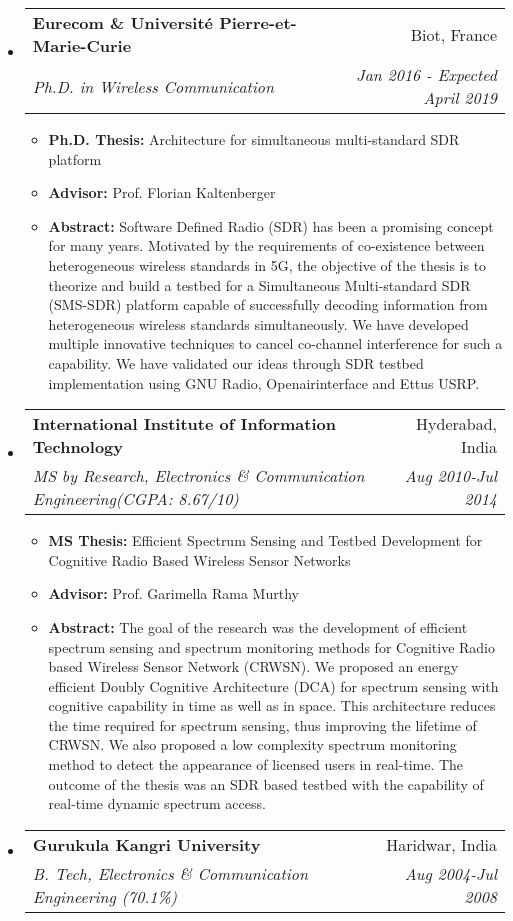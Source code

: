\documentclass[res,10pt]{article}
\makeatletter
\newlength{\outerbordwidth}
\newcommand{\resitem}[1]{\item #1 \vspace{-2pt}}
\newcommand{\resheading}[1]{\vspace{8pt}
  \parbox{\textwidth}{\setlength{\FrameSep}{\outerbordwidth}
    \begin{shaded}
\setlength{\fboxsep}{0pt}\framebox[\textwidth][l]{\setlength{\fboxsep}{4pt}\fcolorbox{shadecolorB}{shadecolorB}{\textbf{\sffamily{\mbox{~}\makebox[6.762in][l]{\large #1} \vphantom{p\^{E}}}}}}
    \end{shaded}
  }\vspace{-5pt}
}
\newcommand{\ressubheading}[4]{
\begin{tabular*}{6.5in}{l@{\cftdotfill{\cftsecdotsep}\extracolsep{\fill}}r}
		\textbf{#1} & #2 \\
		\textit{#3} & \textit{#4} \\
\end{tabular*}\vspace{-6pt}}
\makeatother
\begin{document}
\justify
\vspace{-2em}
\resheading{Education}
\begin{itemize}
\item
	\ressubheading{Eurecom \& Université Pierre-et-Marie-Curie}{Biot, France}{Ph.D. in Wireless Communication}{Jan 2016 - Expected April 2019}
\begin{itemize}
	\resitem{\textbf{Ph.D. Thesis:} Architecture for simultaneous multi-standard SDR platform}
	\resitem{\textbf{Advisor:}  Prof. Florian Kaltenberger}
	\resitem{\textbf{Abstract:} 
	Software Defined Radio (SDR) has been a promising concept for many years. 
		Motivated by the requirements of co-existence between heterogeneous wireless standards in 5G, the objective of the thesis is to theorize and build a testbed for a Simultaneous Multi-standard SDR (SMS-SDR) platform capable of successfully decoding information from heterogeneous wireless standards simultaneously. 
We have developed multiple innovative techniques to cancel co-channel interference for such a capability.
		 We have validated our ideas through SDR testbed implementation using GNU Radio, Openairinterface and Ettus USRP.}
	 \end{itemize}
\item
	\ressubheading{International Institute of Information Technology}{Hyderabad, India}{MS by Research, Electronics \& Communication Engineering(CGPA: 8.67/10)}{Aug 2010-Jul 2014}
\begin{itemize}
	\resitem{\textbf{MS Thesis:} Efficient Spectrum Sensing and Testbed Development for Cognitive Radio Based Wireless
		Sensor Networks}
	\resitem{\textbf{Advisor:} Prof. Garimella Rama Murthy}
	\resitem{\textbf{Abstract:} The goal of the research was the development of efficient spectrum sensing and spectrum monitoring methods for Cognitive Radio based Wireless Sensor Network (CRWSN). We proposed an energy efficient Doubly Cognitive Architecture (DCA) for spectrum sensing with cognitive capability in time as well as in space. This architecture reduces the time required for spectrum sensing, thus improving the lifetime of CRWSN. We also proposed a low complexity spectrum monitoring method to detect the appearance of licensed users in real-time. The outcome of the thesis was an SDR based testbed with the capability of real-time dynamic spectrum access.}
\end{itemize}
\item
	\ressubheading{Gurukula Kangri University}{Haridwar, India}{B. Tech, Electronics \& Communication Engineering (70.1\%)}{Aug 2004-Jul 2008}
\end{itemize}
\end{document}
